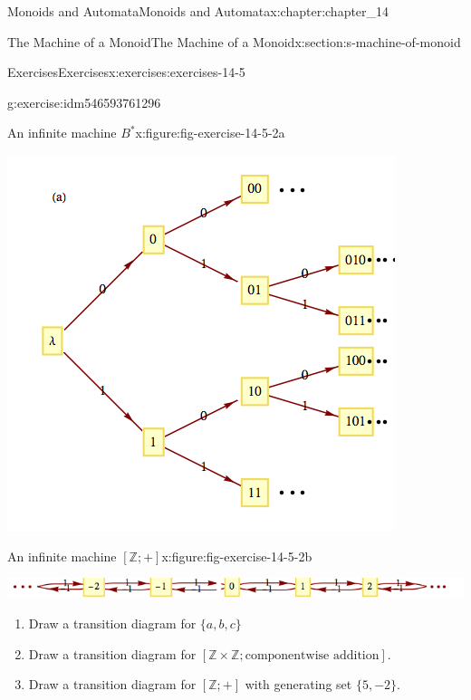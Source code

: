 \documentclass[oneside,10pt,]{book}
\numberwithin{equation}{section}
\begin{document}
\begin{chapterptx}{Monoids and Automata}{}{Monoids and Automata}{}{}{x:chapter:chapter_14}
\begin{sectionptx}{The Machine of a Monoid}{}{The Machine of a Monoid}{}{}{x:section:s-machine-of-monoid}
\begin{exercises-subsection}{Exercises}{}{Exercises}{}{}{x:exercises:exercises-14-5}
\begin{divisionexercise}{2}{}{}{g:exercise:idm546593761296}
\begin{figureptx}{An infinite machine \(B^*\)}{x:figure:fig-exercise-14-5-2a}{}
\begin{image}{0.15}{0.7}{0.15}
\includegraphics[width=\linewidth]{images/fig-exercise-14-5-2a.png}
\end{image}%
\tcblower
\end{figureptx}%
\begin{figureptx}{An infinite machine \([\mathbb{Z};+]\)}{x:figure:fig-exercise-14-5-2b}{}%
\begin{image}{0.15}{0.7}{0.15}%
\includegraphics[width=\linewidth]{images/fig-exercise-14-5-2b.png}
\end{image}%
\tcblower
\end{figureptx}%
%
\begin{enumerate}[label=(\alph*)]
\item{}Draw a transition diagram for \(\{a, b, c\}\)%
\item{}Draw a transition diagram for \([\mathbb{Z}\times \mathbb{Z};\textrm{componentwise addition}]\).%
\item{}Draw a transition diagram for \([\mathbb{Z};+]\) with generating set \(\{5,-2\}\).%
\end{enumerate}
%
\end{divisionexercise}%
\end{exercises-subsection}
\end{sectionptx}
\end{chapterptx}
\end{document}
